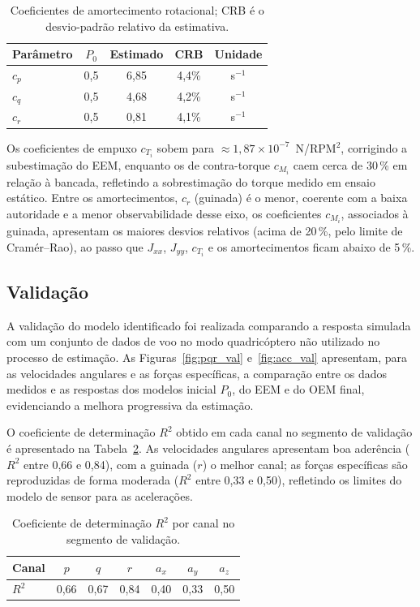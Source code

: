 \documentclass[letterpaper, 10 pt, conference]{ieeeconf}
\begin{document}
\begin{table}[htbp]
\centering
\begin{tabular}{l|c|c|c|c}
\hline
\textbf{Par\^ametro} & \textbf{$P_0$} & \textbf{Estimado} & \textbf{CRB} & \textbf{Unidade} \\
\hline
$c_p$ & 0,5 & 6,85 & 4,4\% & s$^{-1}$ \\
$c_q$ & 0,5 & 4,68 & 4,2\% & s$^{-1}$ \\
$c_r$ & 0,5 & 0,81 & 4,1\% & s$^{-1}$ \\
\hline
\end{tabular}
\caption{Coeficientes de amortecimento rotacional; CRB \'e o desvio-padr\~ao relativo da estimativa.}
\label{tab:param_rot}
\end{table}

Os coeficientes de empuxo $c_{T_i}$ sobem para $\approx 1{,}87\times10^{-7}$~N/RPM$^2$, corrigindo a subestimação do EEM, enquanto os de contra-torque $c_{M_i}$ caem cerca de 30\,\% em relação à bancada, refletindo a sobrestimação do torque medido em ensaio estático. Entre os amortecimentos, $c_r$ (guinada) é o menor, coerente com a baixa autoridade e a menor observabilidade desse eixo, os coeficientes $c_{M_i}$, associados à guinada, apresentam os maiores desvios relativos (acima de 20\,\%, pelo limite de Cramér--Rao), ao passo que $J_{xx}$, $J_{yy}$, $c_{T_i}$ e os amortecimentos ficam abaixo de 5\,\%.

\subsection{Validação}
A validação do modelo identificado foi realizada comparando a resposta simulada com um conjunto de dados de voo no modo quadricóptero não utilizado no processo de estimação. As Figuras~\ref{fig:pqr_val} e~\ref{fig:acc_val} apresentam, para as velocidades angulares e as forças específicas, a comparação entre os dados medidos e as respostas dos modelos inicial $P_0$, do EEM e do OEM final, evidenciando a melhora progressiva da estimação.

O coeficiente de determinação $R^2$ obtido em cada canal no segmento de validação é apresentado na Tabela~\ref{tab:r2_val}. As velocidades angulares apresentam boa aderência ($R^2$ entre 0,66 e 0,84), com a guinada ($r$) o melhor canal; as forças específicas são reproduzidas de forma moderada ($R^2$ entre 0,33 e 0,50), refletindo os limites do modelo de sensor para as acelerações.

\begin{table}[htbp]
\centering
\begin{tabular}{l|c|c|c|c|c|c}
\hline
\textbf{Canal} & $p$ & $q$ & $r$ & $a_x$ & $a_y$ & $a_z$ \\
\hline
$R^2$ & 0,66 & 0,67 & 0,84 & 0,40 & 0,33 & 0,50 \\
\hline
\end{tabular}
\caption{Coeficiente de determinação $R^2$ por canal no segmento de validação.}
\label{tab:r2_val}
\end{table}
\end{document}
